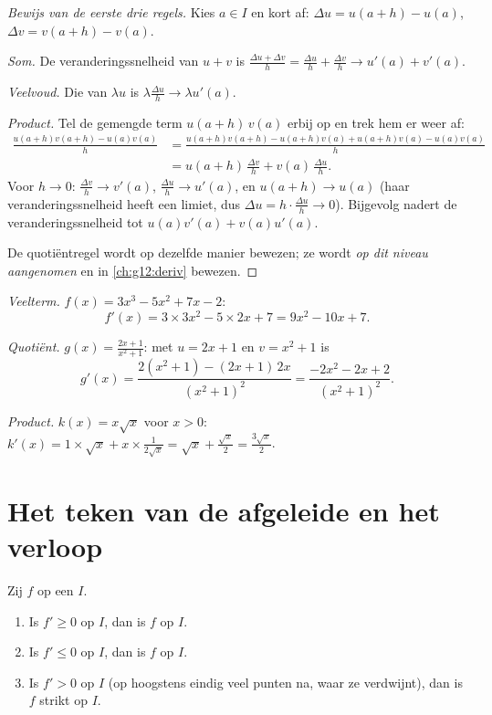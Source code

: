 \begin{proof}[Bewijs van de eerste drie regels]
Kies $a \in I$ en kort af: $\Delta u = u(a+h) - u(a)$,
$\Delta v = v(a+h) - v(a)$.

\emph{Som.} De veranderingssnelheid van $u + v$ is
$\frac{\Delta u + \Delta v}{h} = \frac{\Delta u}{h} + \frac{\Delta v}{h}
\to u'(a) + v'(a)$.

\emph{Veelvoud.} Die van $\lambda u$ is
$\lambda \frac{\Delta u}{h} \to \lambda u'(a)$.

\emph{Product.} Tel de gemengde term $u(a+h)\,v(a)$ erbij op en trek hem er
weer af:
\begin{align*}
\frac{u(a+h)v(a+h) - u(a)v(a)}{h}
&= \frac{u(a+h)v(a+h) - u(a+h)v(a) + u(a+h)v(a) - u(a)v(a)}{h}\\
&= u(a+h)\,\frac{\Delta v}{h} + v(a)\,\frac{\Delta u}{h}.
\end{align*}
Voor $h \to 0$: $\frac{\Delta v}{h} \to v'(a)$,
$\frac{\Delta u}{h} \to u'(a)$, en $u(a+h) \to u(a)$ (haar
veranderingssnelheid heeft een limiet, dus
$\Delta u = h \cdot \frac{\Delta u}{h} \to 0$). Bijgevolg nadert de
veranderingssnelheid tot $u(a)v'(a) + v(a)u'(a)$.

De quotiëntregel wordt op dezelfde manier bewezen; ze wordt \emph{op dit
niveau aangenomen} en in \cref{ch:g12:deriv} bewezen.
\end{proof}

\begin{example}\label{ex:g11:deriv:computations}
\emph{Veelterm.} $f(x) = 3x^3 - 5x^2 + 7x - 2$:
\[
f'(x) = 3 \times 3x^2 - 5 \times 2x + 7 = 9x^2 - 10x + 7 .
\]

\emph{Quotiënt.} $g(x) = \frac{2x+1}{x^2+1}$: met $u = 2x + 1$ en
$v = x^2 + 1$ is
\[
g'(x) = \frac{2(x^2+1) - (2x+1)\,2x}{(x^2+1)^2}
= \frac{-2x^2 - 2x + 2}{(x^2+1)^2}.
\]

\emph{Product.} $k(x) = x\sqrt x$ voor $x > 0$:
$k'(x) = 1 \times \sqrt x + x \times \frac{1}{2\sqrt x}
= \sqrt x + \frac{\sqrt x}{2} = \frac{3\sqrt x}{2}$.
\end{example}

\section{Het teken van de afgeleide en het verloop}

\begin{theorem}\label{thm:g11:deriv:variations}
Zij $f$  op een  $I$.
\begin{enumerate}
  \item Is $f' \geq 0$ op $I$, dan is $f$  op $I$.
  \item Is $f' \leq 0$ op $I$, dan is $f$  op $I$.
  \item Is $f' > 0$ op $I$ (op hoogstens eindig veel punten na, waar ze
        verdwijnt), dan is $f$ strikt  op $I$.
\end{enumerate}
\end{theorem}


